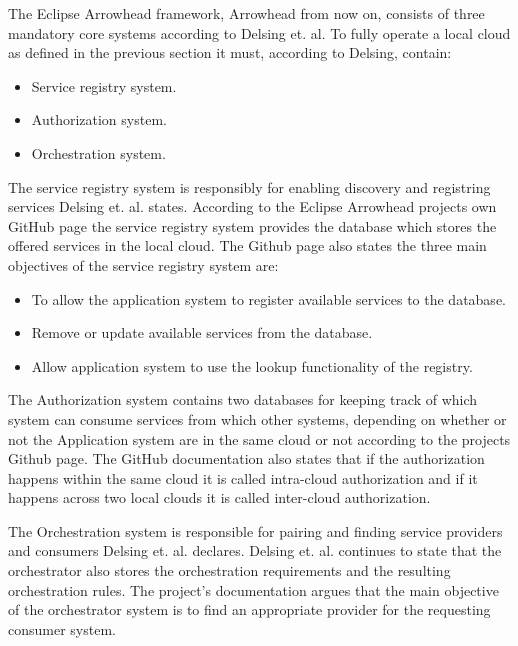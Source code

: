 The Eclipse Arrowhead framework, Arrowhead from now on, consists of three mandatory core systems according to Delsing et. al.
To fully operate a local cloud as defined in the previous section it must, according to Delsing, contain:
\begin{itemize}
    \item Service registry system.
    \item Authorization system. 
    \item Orchestration system.\cite{Delsing2017}
\end{itemize} 

The service registry system is responsibly for enabling discovery and registring services Delsing et. al. states.\cite{Delsing2017} 
According to the Eclipse Arrowhead projects own GitHub page the service registry system provides the database which stores the offered services in the local cloud.\cite{Github2021}
The Github page also states the three main objectives of the service registry system are:
\begin{itemize}
    \item To allow the application system to register available services to the database. 
    \item Remove or update available services from the database.
    \item Allow application system to use the lookup functionality of the registry.
\end{itemize}

The Authorization system contains two databases for keeping track of which system can consume services from which other systems, depending on whether or not the Application system are in the same cloud or not according to the projects Github page.
The GitHub documentation also states that if the authorization happens within the same cloud it is called intra-cloud authorization and if it happens across two local clouds it is called inter-cloud authorization.\cite{Github2021}

The Orchestration system is responsible for pairing and finding service providers and consumers Delsing et. al. declares.
Delsing et. al. continues to state that the orchestrator also stores the orchestration requirements and the resulting orchestration rules.\cite{Delsing2017} 
The project's documentation argues that the main objective of the orchestrator system is to find an appropriate provider for the requesting consumer system.\cite{Github2021}

